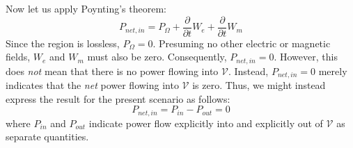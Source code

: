 Now let us apply Poynting's theorem:
%
\begin{equation}
P_{net,in}
= P_{\Omega}
+ \frac{\partial}{\partial t} W_e
+ \frac{\partial}{\partial t} W_m
\end{equation}
%
Since the region is lossless, $P_{\Omega}=0$.
Presuming no other electric or magnetic fields, $W_e$ and $W_m$ must also be zero.
Consequently, $P_{net,in}=0$. 
However, this does \emph{not} mean that there is no power flowing into $\mathcal{V}$.  
Instead, $P_{net,in}=0$ merely indicates that the \emph{net} power flowing into $\mathcal{V}$ is zero. 
Thus, we might instead express the result for the present scenario as follows:
%
\begin{equation}
P_{net,in} = P_{in}-P_{out} = 0
\label{m0122_ePB}
\end{equation} 
%
where $P_{in}$ and $P_{out}$ indicate power flow explicitly into and explicitly out of $\mathcal{V}$ as separate quantities.

